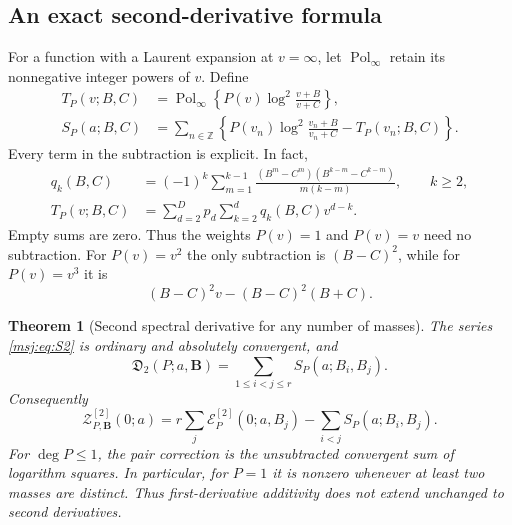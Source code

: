 \documentclass[11pt,a4paper]{article}
\numberwithin{equation}{section}
\theoremstyle{plain}
\newtheorem{theorem}{Theorem}[section]
\theoremstyle{definition}
\theoremstyle{remark}
\begin{document}
\subsection{An exact second-derivative formula}

For a function with a Laurent expansion at $v=\infty$, let
$\operatorname{Pol}_{\infty}$ retain its nonnegative integer powers of
$v$. Define
\begin{align}
 T_P(v;B,C)
 &=\operatorname{Pol}_{\infty}
       \left\{P(v)\log^2\frac{v+B}{v+C}\right\},
 \label{msj:eq:T2}\\
 S_P(a;B,C)
 &=\sum_{n\in\mathbb Z}
 \left\{P(v_n)\log^2\frac{v_n+B}{v_n+C}-T_P(v_n;B,C)\right\}.
 \label{msj:eq:S2}
\end{align}
Every term in the subtraction is explicit. In fact,
\begin{align}
 q_k(B,C)&=(-1)^k\sum_{m=1}^{k-1}
 \frac{(B^m-C^m)(B^{k-m}-C^{k-m})}{m(k-m)},\qquad k\ge2,
 \label{msj:eq:qcoeff}\\
 T_P(v;B,C)&=\sum_{d=2}^{D}p_d\sum_{k=2}^{d}q_k(B,C)v^{d-k}.
 \label{msj:eq:T2-explicit}
\end{align}
Empty sums are zero. Thus the weights $P(v)=1$ and $P(v)=v$ need no
subtraction. For $P(v)=v^2$ the only subtraction is $(B-C)^2$, while
for $P(v)=v^3$ it is
\[
 (B-C)^2v-(B-C)^2(B+C).
\]

\begin{theorem}[Second spectral derivative for any number of masses]
\label{msj:thm:second}
The series \eqref{msj:eq:S2} is ordinary and absolutely convergent, and
\begin{equation}
 \boxed{\displaystyle
 \mathfrak D_2(P;a,\boldsymbol B)
     =\sum_{1\le i<j\le r}S_P(a;B_i,B_j).}
 \label{msj:eq:second-pairwise}
\end{equation}
Consequently
\begin{equation}
 \mathcal Z_{P,\boldsymbol B}^{[2]}(0;a)
 =r\sum_j\mathcal E_P^{[2]}(0;a,B_j)
                       -\sum_{i<j}S_P(a;B_i,B_j).
 \label{msj:eq:second-evaluation}
\end{equation}
For $\deg P\le1$, the pair correction is the unsubtracted convergent
sum of logarithm squares. In particular, for $P=1$ it is nonzero whenever
at least two masses are distinct. Thus first-derivative additivity does
not extend unchanged to second derivatives.
\end{theorem}
\end{document}
